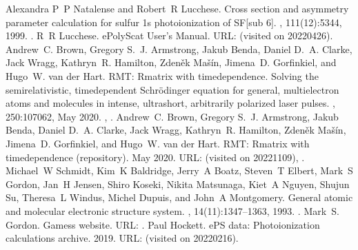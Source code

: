 \documentclass[letterpaper,table,10pt,english]{jupyterBook}
\begin{document}
\begin{sphinxthebibliography}{10}
Alexandra P P Natalense and Robert R Lucchese. Cross section and asymmetry parameter calculation for sulfur 1s photoionization of SF{[}sub 6{]}. , 111(12):5344, 1999. .
\sphinxAtStartPar
R R Lucchese. ePolyScat User's Manual. URL:  (visited on 2022\sphinxhyphen{}04\sphinxhyphen{}26).
\sphinxAtStartPar
Andrew C. Brown, Gregory S. J. Armstrong, Jakub Benda, Daniel D. A. Clarke, Jack Wragg, Kathryn R. Hamilton, Zdeněk Mašín, Jimena D. Gorfinkiel, and Hugo W. van der Hart. RMT: R\sphinxhyphen{}matrix with time\sphinxhyphen{}dependence. Solving the semi\sphinxhyphen{}relativistic, time\sphinxhyphen{}dependent Schrödinger equation for general, multielectron atoms and molecules in intense, ultrashort, arbitrarily polarized laser pulses. , 250:107062, May 2020. , .
\sphinxAtStartPar
Andrew C. Brown, Gregory S. J. Armstrong, Jakub Benda, Daniel D. A. Clarke, Jack Wragg, Kathryn R. Hamilton, Zdeněk Mašín, Jimena D. Gorfinkiel, and Hugo W. van der Hart. RMT: R\sphinxhyphen{}matrix with time\sphinxhyphen{}dependence (repository). May 2020. URL:  (visited on 2022\sphinxhyphen{}11\sphinxhyphen{}09), .
\sphinxAtStartPar
Michael W Schmidt, Kim K Baldridge, Jerry A Boatz, Steven T Elbert, Mark S Gordon, Jan H Jensen, Shiro Koseki, Nikita Matsunaga, Kiet A Nguyen, Shujun Su, Theresa L Windus, Michel Dupuis, and John A Montgomery. General atomic and molecular electronic structure system. , 14(11):1347–1363, 1993. .
\sphinxAtStartPar
Mark S. Gordon. Gamess website. URL: .
\sphinxAtStartPar
Paul Hockett. ePS data: Photoionization calculations archive. 2019. URL:  (visited on 2022\sphinxhyphen{}02\sphinxhyphen{}16).

\end{sphinxthebibliography}
\end{document}
